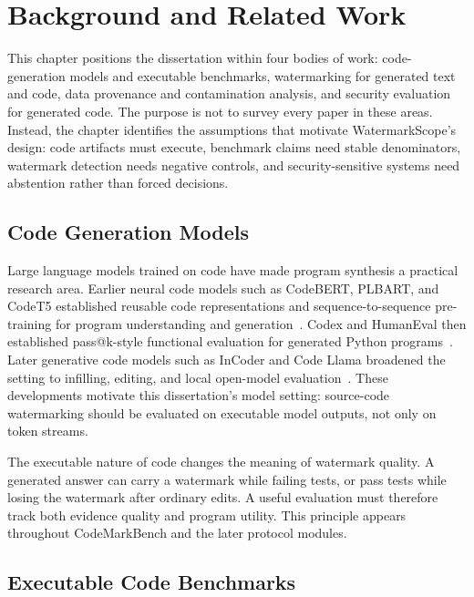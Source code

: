 \chapter{Background and Related Work}\label{cpt:background}

This chapter positions the dissertation within four bodies of work: code-generation models and executable benchmarks, watermarking for generated text and code, data provenance and contamination analysis, and security evaluation for generated code. The purpose is not to survey every paper in these areas. Instead, the chapter identifies the assumptions that motivate WatermarkScope's design: code artifacts must execute, benchmark claims need stable denominators, watermark detection needs negative controls, and security-sensitive systems need abstention rather than forced decisions.

\section{Code Generation Models}

Large language models trained on code have made program synthesis a practical research area. Earlier neural code models such as CodeBERT, PLBART, and CodeT5 established reusable code representations and sequence-to-sequence pre-training for program understanding and generation~\cite{feng2020codebert,ahmad2021plbart,wang2021codet5}. Codex and HumanEval then established pass@k-style functional evaluation for generated Python programs~\cite{chen2021codex}. Later generative code models such as InCoder and Code Llama broadened the setting to infilling, editing, and local open-model evaluation~\cite{fried2023incoder,roziere2023codellama}. These developments motivate this dissertation's model setting: source-code watermarking should be evaluated on executable model outputs, not only on token streams.

The executable nature of code changes the meaning of watermark quality. A generated answer can carry a watermark while failing tests, or pass tests while losing the watermark after ordinary edits. A useful evaluation must therefore track both evidence quality and program utility. This principle appears throughout CodeMarkBench and the later protocol modules.

\section{Executable Code Benchmarks}

